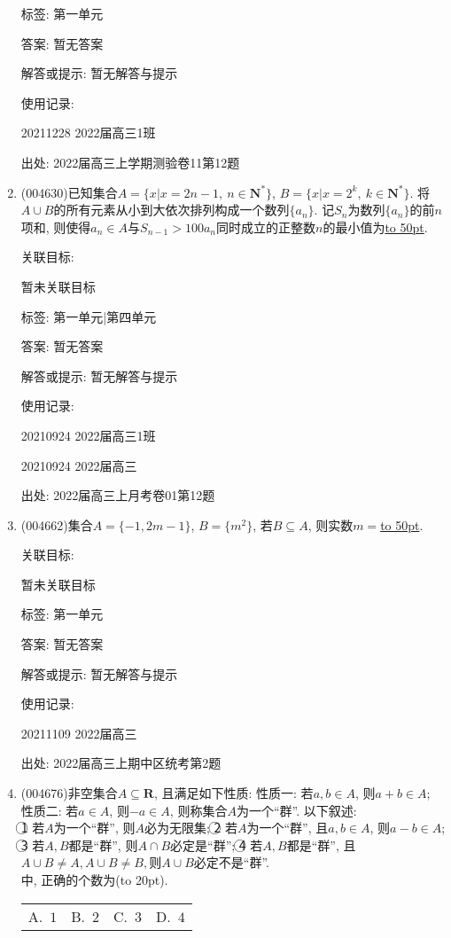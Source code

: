 \documentclass[10pt,a4paper]{article}
\newcommand{\blank}[1]{\underline{\hbox to #1pt{}}}
\newcommand{\bracket}[1]{(\hbox to #1pt{})}
\newcommand{\fourch}[4]{\par\begin{tabular}{p{.23\textwidth}p{.23\textwidth}p{.23\textwidth}p{.23\textwidth}}
A.~#1 &B.~#2& C.~#3& D.~#4
\end{tabular}}
\begin{document}
\begin{enumerate}[1.]
标签: 第一单元

答案: 暂无答案

解答或提示: 暂无解答与提示

使用记录:

20211228	2022届高三1班	


出处: 2022届高三上学期测验卷11第12题
\item { (004630)}已知集合$A=\{x|x=2n-1, \ n\in \mathbf{N}^*\}$, $B=\{x|x=2^k, \ k\in \mathbf{N}^*\}$. 将$A\cup B$的所有元素从小到大依次排列构成一个数列$\{a_n\}$. 记$S_n$为数列$\{a_n\}$的前$n$项和, 则使得$a_n\in A$与${S_{n-1}}>100{a_n}$同时成立的正整数$n$的最小值为\blank{50}.


关联目标:

暂未关联目标



标签: 第一单元|第四单元

答案: 暂无答案

解答或提示: 暂无解答与提示

使用记录:

20210924	2022届高三1班	

20210924	2022届高三	


出处: 2022届高三上月考卷01第12题
\item { (004662)}集合$A=\{-1, 2m-1\}$, $B=\{m^2\}$, 若$B\subseteq A$, 则实数$m=$\blank{50}.


关联目标:

暂未关联目标



标签: 第一单元

答案: 暂无答案

解答或提示: 暂无解答与提示

使用记录:

20211109	2022届高三	


出处: 2022届高三上期中区统考第2题
\item { (004676)}非空集合$A\subseteq \mathbf{R}$, 且满足如下性质:
性质一: 若$a,b\in A$, 则$a+b\in A$;
性质二: 若$a\in A$, 则$-a\in A$, 则称集合$A$为一个``群''. 以下叙述:\\
\textcircled{1} 若$A$为一个``群'', 则$A$必为无限集;
\textcircled{2} 若$A$为一个``群'', 且$a,b\in A$, 则$a-b\in A$;
\textcircled{3} 若$A,B$都是``群'', 则$A\cap B$必定是``群'';
\textcircled{4} 若$A,B$都是``群'', 且$A\cup B\ne A,A\cup B\ne B,$则$A\cup B$必定不是``群''.\\
中, 正确的个数为\bracket{20}.
\fourch{$1$}{$2$}{$3$}{$4$}



\end{enumerate}
\end{document}
